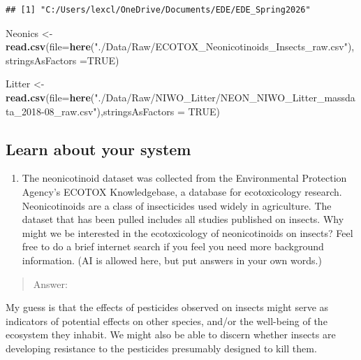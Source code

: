\documentclass[
]{article}
\newenvironment{Shaded}{\begin{snugshade}}{\end{snugshade}}
\newcommand{\AttributeTok}[1]{\textcolor[rgb]{0.13,0.29,0.53}{#1}}
\newcommand{\ConstantTok}[1]{\textcolor[rgb]{0.56,0.35,0.01}{#1}}
\newcommand{\FunctionTok}[1]{\textcolor[rgb]{0.13,0.29,0.53}{\textbf{#1}}}
\newcommand{\NormalTok}[1]{#1}
\newcommand{\OtherTok}[1]{\textcolor[rgb]{0.56,0.35,0.01}{#1}}
\newcommand{\StringTok}[1]{\textcolor[rgb]{0.31,0.60,0.02}{#1}}
\providecommand{\tightlist}{%
  \setlength{\itemsep}{0pt}\setlength{\parskip}{0pt}}
\begin{document}
\begin{verbatim}
## [1] "C:/Users/lexcl/OneDrive/Documents/EDE/EDE_Spring2026"
\end{verbatim}

\begin{Shaded}
\begin{Highlighting}[]
\NormalTok{Neonics }\OtherTok{\textless{}{-}} \FunctionTok{read.csv}\NormalTok{(}\AttributeTok{file=}\FunctionTok{here}\NormalTok{(}\StringTok{"./Data/Raw/ECOTOX\_Neonicotinoids\_Insects\_raw.csv"}\NormalTok{),}\AttributeTok{stringsAsFactors =}\ConstantTok{TRUE}\NormalTok{)}

\NormalTok{Litter }\OtherTok{\textless{}{-}} \FunctionTok{read.csv}\NormalTok{(}\AttributeTok{file=}\FunctionTok{here}\NormalTok{(}\StringTok{"./Data/Raw/NIWO\_Litter/NEON\_NIWO\_Litter\_massdata\_2018{-}08\_raw.csv"}\NormalTok{),}\AttributeTok{stringsAsFactors =} \ConstantTok{TRUE}\NormalTok{)}
\end{Highlighting}
\end{Shaded}

\subsection{Learn about your system}\label{learn-about-your-system}

\begin{enumerate}
\def\labelenumi{\arabic{enumi}.}
\setcounter{enumi}{1}
\tightlist
\item
  The neonicotinoid dataset was collected from the Environmental
  Protection Agency's ECOTOX Knowledgebase, a database for ecotoxicology
  research. Neonicotinoids are a class of insecticides used widely in
  agriculture. The dataset that has been pulled includes all studies
  published on insects. Why might we be interested in the ecotoxicology
  of neonicotinoids on insects? Feel free to do a brief internet search
  if you feel you need more background information. (AI is allowed here,
  but put answers in your own words.)
\end{enumerate}

\begin{quote}
Answer:
\end{quote}

My guess is that the effects of pesticides observed on insects might
serve as indicators of potential effects on other species, and/or the
well-being of the ecosystem they inhabit. We might also be able to
discern whether insects are developing resistance to the pesticides
presumably designed to kill them.
\end{document}
